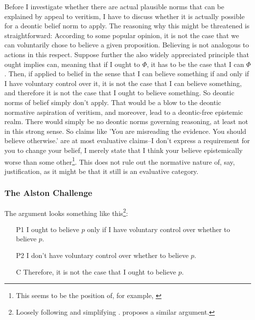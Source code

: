 \documentclass[12pt,numbers=noenddot]{scrartcl}
\begin{document}



Before I investigate whether there are actual plausible norms that can be explained by appeal to veritism, I have to discuss whether it is actually possible for a deontic belief norm to apply. The reasoning why this might be threatened is straightforward: According to some popular opinion, it is not the case that we can voluntarily chose to believe a given proposition. Believing is not analogous to actions in this respect. Suppose further the also widely appreciated principle that ought implies can, meaning that if I ought to $\Phi$, it has to be the case that I can $\Phi$. Then, if applied to belief in the sense that I can believe something if and only if I have voluntary control over it, it is not the case that I can believe something, and therefore it is not the case that I ought to believe something. So deontic norms of belief simply don't apply. That would be a blow to the deontic normative aspiration of veritism, and moreover, lead to a deontic-free epistemic realm. There would simply be no deontic norms governing reasoning, at least not in this strong sense. So claims like 'You are misreading the evidence. You should  believe otherwise.' are at most evaluative claims–I don't express a requirement for you to change your belief, I merely state that I think your believe epistemically worse than some other\footnote{This seems to be the position of, for example, \textcite[241]{grundmann2008}}. This does not rule out the normative nature of, say, justification, as it might be that it still is an evaluative category. 

\subsubsection{The Alston Challenge}

The argument looks something like this\footnote{Loosely following and simplifying \textcite{Alston1988-ALSTDC}. \textcite{Feldman2000-FELTEO-2} proposes a similar argument.}:

\begin{enumerate}
    \item[P1] I ought to believe $p$ only if I have voluntary control over whether to believe $p$.
    \item[P2] I don't have voluntary control over whether to believe $p$.
    \item[C] Therefore, it is not the case that I ought to believe $p$.
\end{enumerate}
\end{document}
